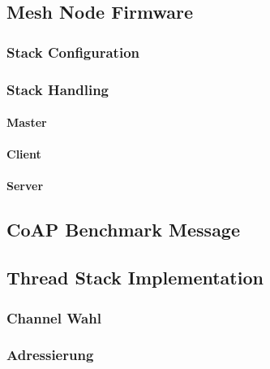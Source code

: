 \subsection{Mesh Node Firmware}\label{subsec:ThreadMeshNodeFirmware}

\subsubsection{Stack Configuration}\label{subsubsec:ThreadStackConfiguration}


\subsubsection{Stack Handling}\label{subsubsec:ThreadStackHandling}


\paragraph{Master}\label{par:ThreadeMaster}

\paragraph{Client}\label{par:ThreadClient}

\paragraph{Server}\label{par:ThreadServer}


\subsection{CoAP Benchmark Message}\label{subsec:ThreadBenchmarkMessage}

\subsection{Thread Stack Implementation}\label{subsec:ThreadStackImplementation}

\subsubsection{Channel Wahl}\label{subsubsec:ThreadChannel}

\subsubsection{Adressierung}\label{subsubsec:ThreadAdressierung}
